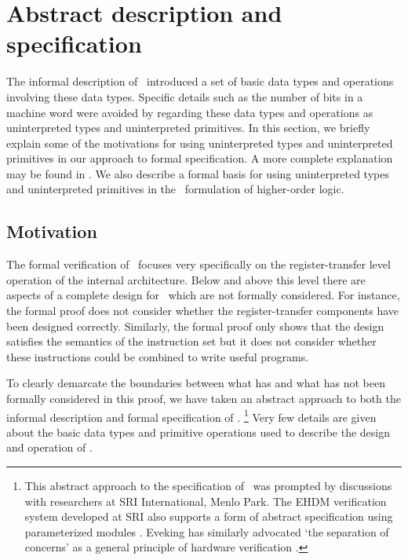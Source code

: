 \section{Abstract description and specification}
\label{sec-abst}

The informal description of \Tamarack\ introduced a set of
basic data types and operations involving these data types.
Specific details such as the number of
bits in a machine word were avoided
by regarding these data types and
operations as uninterpreted types and uninterpreted primitives.
In this section, we briefly explain some of the motivations for using
uninterpreted types and uninterpreted primitives in our approach
to formal specification.
A more complete explanation may be found in \cite{Joyce:thesis}.
We also describe a formal basis for using uninterpreted types and
uninterpreted primitives in the \HOL\ formulation of higher-order logic.

\subsection{Motivation}

The formal verification of \Tamarack\ focuses very specifically
on the register-transfer level operation of the internal architecture.
Below and above this level
there are aspects of a complete design
for \Tamarack\ which are not formally considered.
For instance, the formal proof does not consider whether
the register-transfer components have been designed correctly.
Similarly, the formal proof only shows that the design satisfies
the semantics of the instruction set but it does not consider whether
these instructions could be combined to write useful programs.

To clearly demarcate the boundaries between what has and what has not
been formally considered in this proof,
we have taken an abstract approach to both the informal description
and formal specification of \Tamarack.
\footnote{
This abstract approach to the specification of \Tamarack\
was prompted by discussions with
researchers at SRI International, Menlo Park.
The EHDM verification system developed at SRI also supports
a form of abstract specification using parameterized modules \cite{EHDM}.
Eveking has similarly advocated `the separation of concerns'
as a general principle of hardware verification \cite{Eveking:glasgow}.}
Very few details are given about the basic data types
and primitive operations used to describe the design and operation
of \Tamarack.

